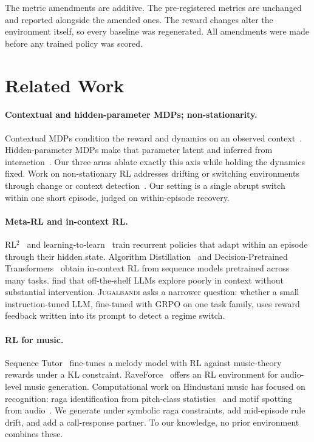 \documentclass[11pt]{article}
\newcommand{\env}{\textsc{Jugalbandi}}
\begin{document}
The metric amendments are additive. The pre-registered metrics are unchanged and reported alongside the amended ones. The reward changes alter the environment itself, so every baseline was regenerated. All amendments were made before any trained policy was scored.

\section{Related Work}
\label{sec:related}

\paragraph{Contextual and hidden-parameter MDPs; non-stationarity.} Contextual MDPs condition the reward and dynamics on an observed context~\citep{hallak2015cmdp}. Hidden-parameter MDPs make that parameter latent and inferred from interaction~\citep{doshivelez2013hipmdp}. Our three arms ablate exactly this axis while holding the dynamics fixed. Work on non-stationary RL addresses drifting or switching environments through change or context detection~\citep{dasilva2006context,padakandla2020survey}. Our setting is a single abrupt switch within one short episode, judged on within-episode recovery.

\paragraph{Meta-RL and in-context RL.} RL$^2$~\citep{duan2016rl2} and learning-to-learn~\citep{wang2016learning} train recurrent policies that adapt within an episode through their hidden state. Algorithm Distillation~\citep{laskin2022ad} and Decision-Pretrained Transformers~\citep{lee2023dpt} obtain in-context RL from sequence models pretrained across many tasks. \citet{krishnamurthy2024explore} find that off-the-shelf LLMs explore poorly in context without substantial intervention. \env{} asks a narrower question: whether a small instruction-tuned LLM, fine-tuned with GRPO on one task family, uses reward feedback written into its prompt to detect a regime switch.

\paragraph{RL for music.} Sequence Tutor~\citep{jaques2017sequencetutor} fine-tunes a melody model with RL against music-theory rewards under a KL constraint. RaveForce~\citep{lan2019raveforce} offers an RL environment for audio-level music generation. Computational work on Hindustani music has focused on recognition: raga identification from pitch-class statistics~\citep{chordia2007raag} and motif spotting from audio~\citep{ross2012motifs}. We generate under symbolic raga constraints, add mid-episode rule drift, and add a call-response partner. To our knowledge, no prior environment combines these.
\end{document}
